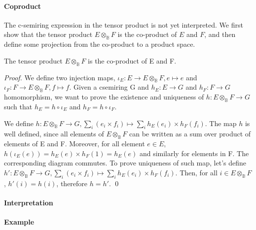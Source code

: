 \paragraph{Coproduct} The c-semiring expression in the tensor product is not yet interpreted. We first show that the tensor product $E\otimes_{\mathbb{B}} F$ is the co-product of $E$ and $F$, and then define some projection from the co-product to a product space.
\begin{theorem}
	The tensor product $E \otimes_{\mathbb{B}} F$ is the co-product of E and F.
\end{theorem}
\begin{proof}
	We define two injection maps, $\iota_E : E \rightarrow E \otimes_{\mathbb{B}} F, e \mapsto e $ and $\iota_F : F \rightarrow E \otimes_{\mathbb{B}} F, f \mapsto f $. Given a csemiring G and $h_E : E \rightarrow G$ and $h_F : F \rightarrow G$ homomorphism, we want to prove the existence and uniqueness of $h : E \otimes_{\mathbb{B}} F \rightarrow G$ such that $h_E = h \circ \iota_E$ and $h_F = h \circ \iota_F$.
	
	We define $h : E \otimes_{\mathbb{B}} F \rightarrow G, \sum_i(e_i \times f_i) \mapsto \sum_i h_E(e_i)\times h_F(f_i)$. The map $h$ is well defined, since all elements of $E \otimes_{\mathbb{B}} F$ can be written as a sum over product of elements of E and F. Moreover, for all element $e\in E$, $h(\iota_E(e))=h_E(e) \times h_F(1) = h_E(e)$ and similarly for elements in F. The corresponding diagram commutes. To prove uniqueness of such map, let's define $h': E \otimes_{\mathbb{B}} F \rightarrow G, \sum_i(e_i \times f_i) \mapsto \sum_i h_E(e_i)\times h_F(f_i)$. Then, for all $i \in E \otimes_{\mathbb{B}} F$, $h'(i) = h(i)$, therefore $h=h'$. \qed
\end{proof}

\paragraph{Interpretation}

\paragraph{Example}
